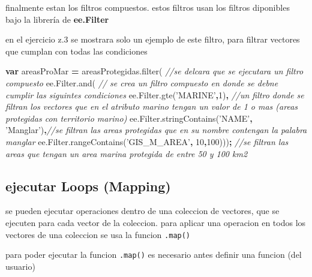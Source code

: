 \documentclass[
]{article}
\newenvironment{Shaded}{\begin{snugshade}}{\end{snugshade}}
\newcommand{\AttributeTok}[1]{\textcolor[rgb]{0.77,0.63,0.00}{#1}}
\newcommand{\CommentTok}[1]{\textcolor[rgb]{0.56,0.35,0.01}{\textit{#1}}}
\newcommand{\DecValTok}[1]{\textcolor[rgb]{0.00,0.00,0.81}{#1}}
\newcommand{\KeywordTok}[1]{\textcolor[rgb]{0.13,0.29,0.53}{\textbf{#1}}}
\newcommand{\NormalTok}[1]{#1}
\newcommand{\OperatorTok}[1]{\textcolor[rgb]{0.81,0.36,0.00}{\textbf{#1}}}
\newcommand{\StringTok}[1]{\textcolor[rgb]{0.31,0.60,0.02}{#1}}
\newcommand{\VariableTok}[1]{\textcolor[rgb]{0.00,0.00,0.00}{#1}}
\begin{document}
finalmente estan los filtros compuestos. estos filtros usan los filtros
diponibles bajo la librería de \textbf{ee.Filter}

en el ejercicio z.3 se mostrara solo un ejemplo de este filtro, para
filtrar vectores que cumplan con todas las condiciones

\begin{Shaded}
\begin{Highlighting}[]
\KeywordTok{var}\NormalTok{ areasProMar }\OperatorTok{=} \VariableTok{areasProtegidas}\NormalTok{.}\AttributeTok{filter}\NormalTok{( }\CommentTok{//se delcara que se ejecutara un filtro compuesto}
    \VariableTok{ee}\NormalTok{.}\VariableTok{Filter}\NormalTok{.}\AttributeTok{and}\NormalTok{(  }\CommentTok{// se crea un filtro compuesto en donde se debne cumplir las siguintes condiciones}
      \VariableTok{ee}\NormalTok{.}\VariableTok{Filter}\NormalTok{.}\AttributeTok{gte}\NormalTok{(}\StringTok{'MARINE'}\OperatorTok{,}\DecValTok{1}\NormalTok{)}\OperatorTok{,} \CommentTok{//un filtro donde se filtran los vectores que en el atributo marino tengan un valor de 1 o mas (areas protegidas con territorio marino)}
      \VariableTok{ee}\NormalTok{.}\VariableTok{Filter}\NormalTok{.}\AttributeTok{stringContains}\NormalTok{(}\StringTok{'NAME'}\OperatorTok{,} \StringTok{'Manglar'}\NormalTok{)}\OperatorTok{,}\CommentTok{//se filtran las areas protegidas que en su nombre contengan la palabra manglar}
      \VariableTok{ee}\NormalTok{.}\VariableTok{Filter}\NormalTok{.}\AttributeTok{rangeContains}\NormalTok{(}\StringTok{'GIS_M_AREA'}\OperatorTok{,} \DecValTok{10}\OperatorTok{,}\DecValTok{100}\NormalTok{)))}\OperatorTok{;} \CommentTok{//se filtran las areas que tengan un area marina protegida de entre 50 y 100 km2}
\end{Highlighting}
\end{Shaded}

\hypertarget{ejecutar-loops-mapping}{%
\subsection{ejecutar Loops (Mapping)}\label{ejecutar-loops-mapping}}

se pueden ejecutar operaciones dentro de una coleccion de vectores, que
se ejecuten para cada vector de la coleccion. para aplicar una operacion
en todos los vectores de una coleccion se usa la funcion \texttt{.map()}

para poder ejecutar la funcion \texttt{.map()} es necesario antes
definir una funcion (del usuario)
\end{document}
